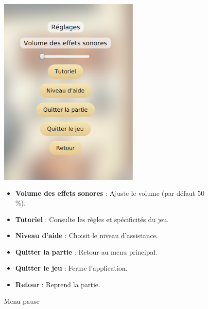 \begin{figure}[h]
    \centering
    \begin{minipage}{0.4\textwidth}
        \includegraphics[width=7cm]{../Annexe/Screen/Pause.png}
        \caption{Menu pause}
    \end{minipage}%
    \hfill
    \begin{minipage}{0.55\textwidth}
        \begin{itemize}
            \item \textbf{Volume des effets sonores} : Ajuste le volume (par défaut 50 \%).
            \item \textbf{Tutoriel} : Consulte les règles et spécificités du jeu.
            \item \textbf{Niveau d'aide} : Choisit le niveau d'assistance.
            \item \textbf{Quitter la partie} : Retour au menu principal.
            \item \textbf{Quitter le jeu} : Ferme l'application.
            \item \textbf{Retour} : Reprend la partie.
        \end{itemize}
    \end{minipage}
\end{figure}
